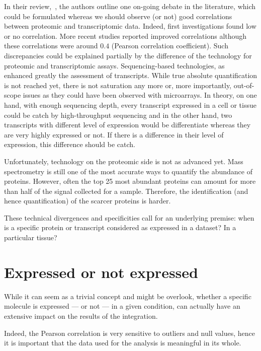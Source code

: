 In their review,~\cite{Uhlen:2016}, the authors outline one on-going debate
in the literature, which could be formulated whereas we should observe (or not)
good correlations between proteomic and transcriptomic data.
Indeed, first investigations found low or no correlation. More recent
studies reported improved correlations although these correlations were around
$0.4$ (Pearson correlation coefficient). Such discrepancies could be explained
partially by the difference of the technology for proteomic and transcriptomic
assays. Sequencing-based technologies, as \Rnaseq\, enhanced greatly the
assessment of transcripts. While true absolute quantification is not reached yet,
there is not saturation any more or, more importantly, out-of-scope issues as
they could have been observed with microarrays. In theory, on one hand, with
enough sequencing depth, every transcript expressed in a cell or tissue could be
catch by high-throughput sequencing and in the other hand, two transcripts with
different level of expression would be differentiate whereas they are very highly
expressed or not. If there is a difference in their level of expression, this
difference should be catch.

Unfortunately, technology on the proteomic side is not as advanced yet.
Mass spectrometry is still one of the most accurate ways to quantify the
abundance of proteins. However, often the top 25 most abundant proteins can
amount for more than half of the signal collected for a sample. Therefore, the
identification (and hence quantification) of the scarcer proteins is harder.

These technical divergences and specificities call for an underlying premise:
when is a specific protein or transcript considered as expressed in a dataset?
In a particular tissue?

\section{Expressed or not expressed}
\label{sec:IntegrationExpressedOrNot}
While it can seem as a trivial concept and might be overlook, whether a specific
molecule is expressed --- or not --- in a given condition, can actually have
an extensive impact on the results of the integration.

Indeed, the Pearson correlation is very sensitive to outliers and null values,
hence it is important that the data used for the analysis is meaningful in
its whole.

